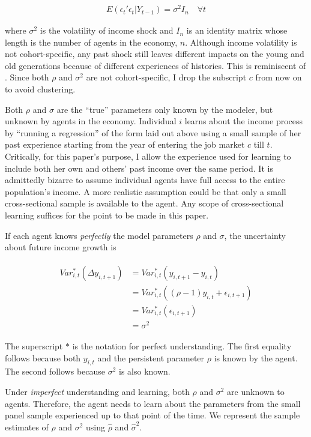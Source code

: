 \documentclass[12pt,notitlepage,onecolumn,aps,pra]{article}
\begin{document}
\begin{eqnarray}
E(\epsilon_{t}'\epsilon_{t}|Y_{t-1}) = \sigma^2 I_n \quad \forall t 
\end{eqnarray}

where \(\sigma^2\) is the volatility of income shock and \(I_n\) is an
identity matrix whose length is the number of agents in the economy,
\(n\). Although income volatility is not cohort-specific, any past shock
still leaves different impacts on the young and old generations because
of different experiences of histories. This is reminiscent of
\cite{bansal2004risks}. Since both \(\rho\) and \(\sigma^2\) are not
cohort-specific, I drop the subscript \(c\) from now on to avoid
clustering.

Both \(\rho\) and \(\sigma\) are the ``true'' parameters only known by
the modeler, but unknown by agents in the economy. Individual \(i\)
learns about the income process by ``running a regression'' of the form
laid out above using a small sample of her past experience starting from
the year of entering the job market \(c\) till \(t\). Critically, for
this paper's purpose, I allow the experience used for learning to
include both her own and others' past income over the same period. It is
admittedly bizarre to assume individual agents have full access to the
entire population's income. A more realistic assumption could be that
only a small cross-sectional sample is available to the agent. Any scope
of cross-sectional learning suffices for the point to be made in this
paper.

    If each agent knows \emph{perfectly} the model parameters \(\rho\) and
\(\sigma\), the uncertainty about future income growth is

\begin{eqnarray}
\begin{split}
Var^*_{i,t}(\Delta y_{i,t+1}) & =  Var^*_{i,t}(y_{i,t+1}- y_{i,t}) \\ 
& =  Var^*_{i,t}((\rho-1)y_{i,t} + \epsilon_{i,t+1}) \\
& = Var^*_{i,t}(\epsilon_{i,t+1}) \\
& = \sigma^2
\end{split}
\end{eqnarray}

The superscript \(*\) is the notation for perfect understanding. The
first equality follows because both \(y_{i,t}\) and the persistent
parameter \(\rho\) is known by the agent. The second follows because
\(\sigma^2\) is also known.

Under \emph{imperfect} understanding and learning, both \(\rho\) and
\(\sigma^2\) are unknown to agents. Therefore, the agent needs to learn
about the parameters from the small panel sample experienced up to that
point of the time. We represent the sample estimates of \(\rho\) and
\(\sigma^2\) using \(\widehat \rho\) and \(\hat{\sigma}^2\).
\end{document}
